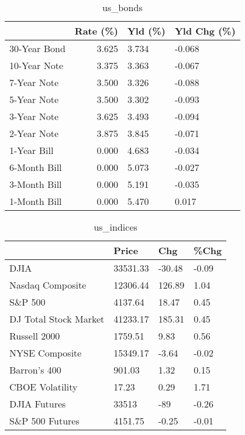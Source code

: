 \documentclass{article}%
\begin{document}
%


\begin{table}[htbp]%
\caption{us\_bonds}%
\centering%
\begin{adjustbox}{width=1\textwidth}%
\begin{tabular}{lrll}
\toprule
             &  Rate (\%) & Yld (\%) & Yld Chg (\%) \\
\midrule
30-Year Bond &     3.625 &   3.734 &      -0.068 \\
10-Year Note &     3.375 &   3.363 &      -0.067 \\
 7-Year Note &     3.500 &   3.326 &      -0.088 \\
 5-Year Note &     3.500 &   3.302 &      -0.093 \\
 3-Year Note &     3.625 &   3.493 &      -0.094 \\
 2-Year Note &     3.875 &   3.845 &      -0.071 \\
 1-Year Bill &     0.000 &   4.683 &      -0.034 \\
6-Month Bill &     0.000 &   5.073 &      -0.027 \\
3-Month Bill &     0.000 &   5.191 &      -0.035 \\
1-Month Bill &     0.000 &   5.470 &       0.017 \\
\bottomrule
\end{tabular}
%
\end{adjustbox}%
\end{table}

%


\begin{table}[htbp]%
\caption{us\_indices}%
\centering%
\begin{adjustbox}{width=1\textwidth}%
\begin{tabular}{llll}
\toprule
                      &    Price &    Chg &  \%Chg \\
\midrule
                 DJIA & 33531.33 & -30.48 & -0.09 \\
     Nasdaq Composite & 12306.44 & 126.89 &  1.04 \\
              S\&P 500 &  4137.64 &  18.47 &  0.45 \\
DJ Total Stock Market & 41233.17 & 185.31 &  0.45 \\
         Russell 2000 &  1759.51 &   9.83 &  0.56 \\
       NYSE Composite & 15349.17 &  -3.64 & -0.02 \\
         Barron's 400 &   901.03 &   1.32 &  0.15 \\
      CBOE Volatility &    17.23 &   0.29 &  1.71 \\
         DJIA Futures &    33513 &    -89 & -0.26 \\
      S\&P 500 Futures &  4151.75 &  -0.25 & -0.01 \\
\bottomrule
\end{tabular}
%
\end{adjustbox}%
\end{table}
\end{document}
